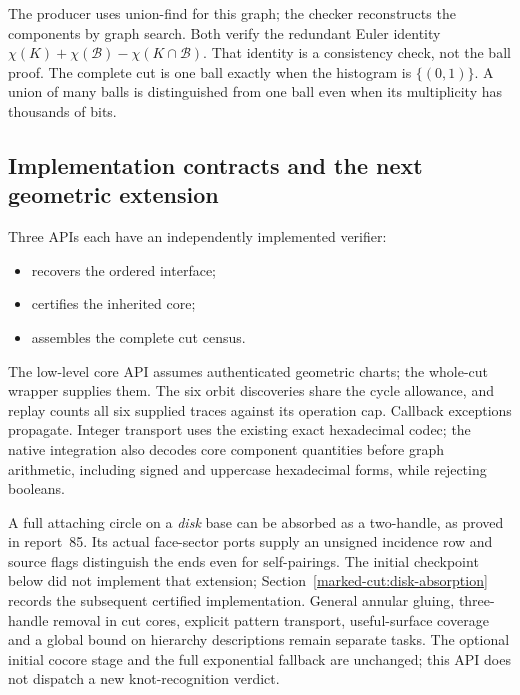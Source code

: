 The producer uses union-find for this graph; the checker reconstructs the
components by graph search. Both verify the redundant Euler identity
$\chi(K)+\chi(\mathcal B)-\chi(K\cap\mathcal B)$. That identity is a
consistency check, not the ball proof. The complete cut is one ball exactly
when the histogram is $\{(0,1)\}$. A union of many balls is distinguished from
one ball even when its multiplicity has thousands of bits.

\subsection{Implementation contracts and the next geometric extension}

Three APIs each have an independently implemented verifier:
\begin{itemize}
\item {} recovers the ordered interface;
\item {} certifies the inherited core;
\item {} assembles the complete cut census.
\end{itemize}
The low-level core API
assumes authenticated geometric charts; the whole-cut wrapper supplies them.
The six orbit discoveries share the cycle allowance, and replay counts all
six supplied traces against its operation cap. Callback exceptions propagate.
Integer transport uses the existing exact hexadecimal codec; the native
integration also decodes core component quantities before graph arithmetic,
including signed and uppercase hexadecimal forms, while rejecting booleans.

A full attaching circle on a \emph{disk} base can be absorbed as a two-handle,
as proved in report~85. Its actual face-sector ports supply an unsigned
incidence row and source flags distinguish the ends even for self-pairings.
The initial checkpoint below did not implement that extension;
Section~\ref{marked-cut:disk-absorption} records the subsequent certified
implementation. General annular gluing,
three-handle removal in cut cores, explicit pattern transport, useful-surface
coverage and a global bound on hierarchy descriptions remain separate tasks.
The optional initial cocore stage and the full exponential fallback are
unchanged; this API does not dispatch a new knot-recognition verdict.





